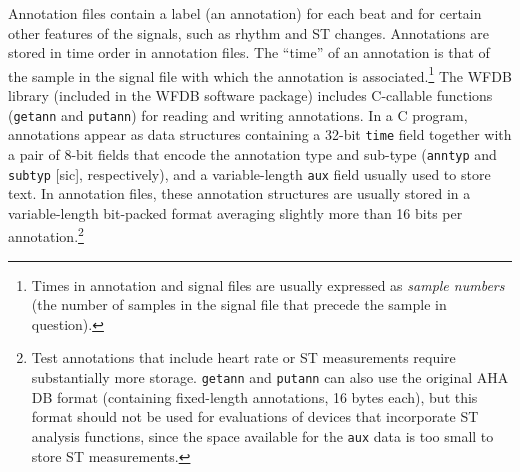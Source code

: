 \documentclass[twoside]{article}
\begin{document}
Annotation files contain a label (an annotation) for each beat and for certain
other features of the signals, such as rhythm and ST changes.  Annotations are
stored in time order in annotation files.  The ``time'' of an annotation is
that of the sample in the signal file with which the annotation is
associated.\footnote{Times in annotation and signal files are usually expressed
as {\em sample numbers} (the number of samples in the signal file that precede
the sample in question).} The WFDB library (included in the WFDB software package)
includes C-callable functions ({\tt getann} and {\tt putann}) for reading and
writing annotations.  In a C program, annotations appear as data structures
containing a 32-bit {\tt time} field together with a pair of 8-bit fields that
encode the annotation type and sub-type ({\tt anntyp} and {\tt subtyp} [sic],
respectively), and a variable-length {\tt aux} field usually used to store
text.  In annotation files, these annotation structures are usually stored in
a variable-length bit-packed format averaging slightly more than 16 bits per
annotation.\footnote{Test annotations that include heart rate or ST
measurements require substantially more storage.  {\tt getann} and
{\tt putann} can also use the original AHA DB format (containing fixed-length
annotations, 16 bytes each), but this format should not be used for
evaluations of devices that incorporate ST analysis functions, since the
space available for the {\tt aux} data is too small to store ST measurements.}
\end{document}
